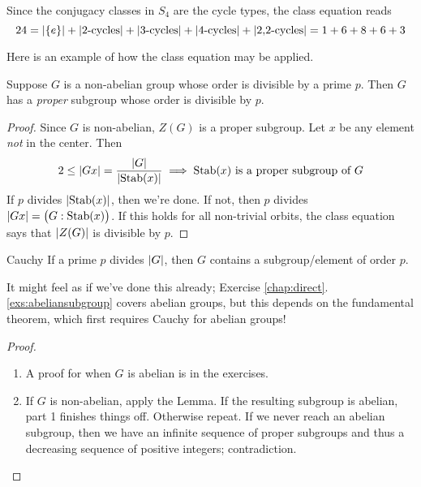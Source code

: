 \begin{example}{}{}
	Since the conjugacy classes in $S_4$ are the cycle types, the class equation reads
	\[
		24=\left| \{e\}\right| +\left| \text{2-cycles}\right| +\left| \text{3-cycles}\right| +\left| \text{4-cycles}\right| +\left| \text{2,2-cycles}\right|
		=1+6+8+6+3
	\]
\end{example}

Here is an example of how the class equation may be applied.

\begin{lemm}{}{}
	Suppose $G$ is a non-abelian group whose order is divisible by a prime $p$. Then $G$ has a \emph{proper} subgroup whose order is divisible by $p$.
\end{lemm}

\begin{proof}
	Since $G$ is non-abelian, $Z(G)$ is a proper subgroup. Let $x$ be any element \emph{not} in the center. Then
	\[
		2\le \left| Gx\right|=\frac{\left| G\right|}{\left| \operatorname{Stab}(x)\right|} 
		\implies \operatorname{Stab}(x)\text{ is a proper subgroup of }G
	\]
	If $p$ divides $\left| \operatorname{Stab}(x)\right|$, then we're done. If not, then $p$ divides $\left| Gx\right|=\bigl(G:\operatorname{Stab}(x)\bigr)$. If this holds for all non-trivial orbits, the class equation says that $\left| Z(G)\right|$ is divisible by $p$.
\end{proof}


\begin{thm}{Cauchy}{}
	If a prime $p$ divides $\left| G\right|$, then $G$ contains a subgroup/element of order $p$. 
\end{thm}


It might feel as if we've done this already; Exercise \ref*{chap:direct}.\ref{exs:abeliansubgroup} covers abelian groups, but this depends on the fundamental theorem, which first requires Cauchy for abelian groups! 



\begin{proof}
	\begin{enumerate}
	  \item A proof for when $G$ is abelian is in the exercises.
	  \item If $G$ is non-abelian, apply the Lemma. If the resulting subgroup is abelian, part 1 finishes things off. Otherwise repeat. If we never reach an abelian subgroup, then we have an infinite sequence of proper subgroups and thus a decreasing sequence of positive integers; contradiction.\qedhere
	\end{enumerate}
\end{proof}

